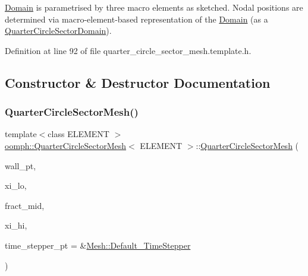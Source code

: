\hyperlink{classoomph_1_1Domain}{Domain} is parametrised by three macro elements as sketched. Nodal positions are determined via macro-\/element-\/based representation of the \hyperlink{classoomph_1_1Domain}{Domain} (as a \hyperlink{classoomph_1_1QuarterCircleSectorDomain}{Quarter\+Circle\+Sector\+Domain}). 

Definition at line 92 of file quarter\+\_\+circle\+\_\+sector\+\_\+mesh.\+template.\+h.



\subsection{Constructor \& Destructor Documentation}
\mbox{\label{classoomph_1_1QuarterCircleSectorMesh_a3fbcc7dd28aefc3dddda607785695afc}} 
\subsubsection{\texorpdfstring{Quarter\+Circle\+Sector\+Mesh()}{QuarterCircleSectorMesh()}}
{\footnotesize\ttfamily template$<$class E\+L\+E\+M\+E\+NT $>$ \\
\hyperlink{classoomph_1_1QuarterCircleSectorMesh}{oomph\+::\+Quarter\+Circle\+Sector\+Mesh}$<$ E\+L\+E\+M\+E\+NT $>$\+::\hyperlink{classoomph_1_1QuarterCircleSectorMesh}{Quarter\+Circle\+Sector\+Mesh} (\begin{DoxyParamCaption}\item[{\hyperlink{classoomph_1_1GeomObject}{Geom\+Object} $\ast$}]{wall\+\_\+pt,  }\item[{const double \&}]{xi\+\_\+lo,  }\item[{const double \&}]{fract\+\_\+mid,  }\item[{const double \&}]{xi\+\_\+hi,  }\item[{\hyperlink{classoomph_1_1TimeStepper}{Time\+Stepper} $\ast$}]{time\+\_\+stepper\+\_\+pt = {\ttfamily \&\hyperlink{classoomph_1_1Mesh_a12243d0fee2b1fcee729ee5a4777ea10}{Mesh\+::\+Default\+\_\+\+Time\+Stepper}} }\end{DoxyParamCaption})}



